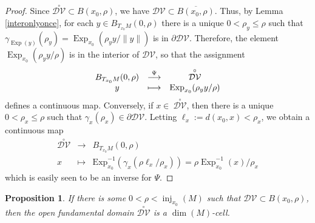 \documentclass[11pt,twoside]{amsart}
\theoremstyle{plain}
\newtheorem{prop}{Proposition}[section]
\newcommand{\longto}{\longrightarrow}
\DeclareMathOperator{\Exp}{\mathrm{Exp}}
\DeclareMathOperator\inj{inj}
\begin{document}
\begin{proof}
Since $\stackrel{\circ}{\mathcal{DV}}\subset B(x_0,\rho)$, we have $\mathcal{DV}\subset\overline{B(x_0,\rho)}$. Thus, by Lemma \ref{interonlyonce}, for each $y\in B_{T_{x_0}M}(0,\rho)$ there is a unique $0<\rho_y\le\rho$ such that $\gamma_{\Exp(y)}(\rho_y)=\Exp_{x_0}(\rho_yy/\|y\|)$ is in $\partial\mathcal{DV}$. Therefore, the element $\Exp_{x_0}(\rho_yy/\rho)$ is in the interior of $\mathcal{DV}$, so that the assignment
\[\begin{array}{ccc}
B_{T_{x_0}M}(0,\rho) & \stackrel{\tiny{\Psi}}\longto & \stackrel{\circ}{\mathcal{DV}} \\ y & \longmapsto & \Exp_{x_0}(\rho_yy/\rho)\end{array}\]
defines a continuous map. Conversely, if $x\in~\stackrel{\circ}{\mathcal{DV}}$, then there is a unique $0<\rho_x\le\rho$ such that $\gamma_x(\rho_x)\in\partial\mathcal{DV}$. Letting $\ell_x:=d(x_0,x)<\rho_x$, we obtain a continuous map
\[\begin{array}{ccc}
\stackrel{\circ}{\mathcal{DV}} & \longto & B_{T_{x_0}M}(0,\rho) \\ x & \longmapsto & \mathrm{Exp}_{x_0}^{-1}(\gamma_x(\rho\ell_x/\rho_x))=\rho \Exp_{x_0}^{-1}(x)/\rho_x\end{array}\]
which is easily seen to be an inverse for $\Psi$.
\end{proof}
\iffalse
\begin{prop}\label{intDVcell}
If there is some $0<\rho<\inj_{x_0}(M)$ such that $\mathcal{DV}\subset B(x_0,\rho)$, then the open fundamental domain $\stackrel{\circ}{\mathcal{DV}}$ is a $\dim(M)$-cell.
\end{prop}
\end{document}
